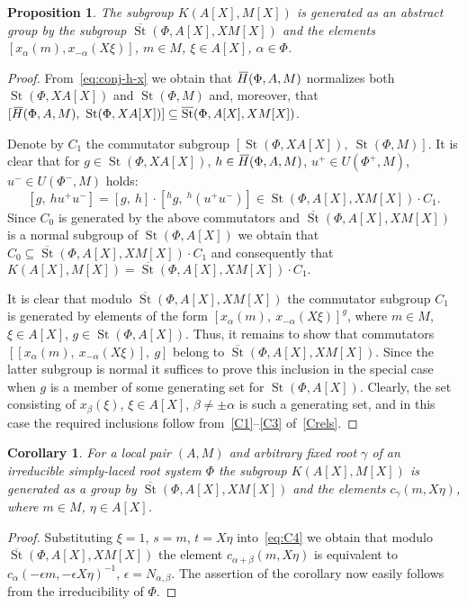 \documentclass[oneside, 8pt]{amsart}
\newtheorem{prop}[lemma]{Proposition}
\newtheorem{corollary}[lemma]{Corollary}
\theoremstyle{remark}
\theoremstyle{definition}
\numberwithin{lemma}{section}
\numberwithin{prop}{section}
\numberwithin{corollary}{section}
\numberwithin{externaltheorem}{section}
\DeclareMathOperator{\St}{St}
\newcommand{\myol}[2][3]{{}\mkern#1mu\overline{\mkern-#1mu#2}}
\numberwithin{equation}{section}
\begin{document}
\begin{prop} \label{Kgen} The subgroup $K(A[X], M[X])$ is generated as an abstract group by the subgroup $\overline{\St}(\Phi, A[X], XM[X])$ and
 the elements $[x_\alpha(m), x_{-\alpha}(X\xi)]$, $m \in M$, $\xi \in A[X]$, $\alpha \in \Phi$. \end{prop}
\begin{proof} From~\eqref{eq:conj-h-x} we obtain that $\myol{H}(\Phi, A, M)$ normalizes both $\St(\Phi, XA[X])$ and $\St(\Phi, M)$ and, moreover, that $[\myol{H}(\Phi, A, M),\ \St(\Phi, XA[X])] \subseteq \overline{\St}(\Phi, A[X], XM[X])$. 

Denote by $C_1$ the commutator subgroup $[\St(\Phi, XA[X]),\ \St(\Phi, M)]$.
It is clear that for $g \in \St(\Phi, XA[X])$, $h \in \myol{H}(\Phi, A, M)$, $u^+ \in U(\Phi^+, M)$, $u^- \in U(\Phi^-, M)$ holds:
\[ [g,\ h u^+ u^-] = [g,\ h] \cdot [{}^{h}\!g,\ {}^{h}\!(u^+u^-)] \in \St(\Phi, A[X], XM[X]) \cdot C_1.\]
Since $C_0$ is generated by the above commutators and $\overline{\St}(\Phi, A[X], XM[X])$ is a normal subgroup of $\St(\Phi, A[X])$
we obtain that $C_0 \subseteq \overline{\St}(\Phi, A[X], XM[X]) \cdot C_1$ and consequently that
$K(A[X], M[X]) = \overline{\St}(\Phi, A[X], XM[X]) \cdot C_1.$
 
It is clear that modulo $\overline{\St}(\Phi, A[X], XM[X])$ the commutator subgroup $C_1$ is generated by elements of the form $[x_\alpha(m),\ x_{-\alpha}(X\xi)]^g$, where $m \in M$, $\xi \in A[X]$, $g \in \St(\Phi, A[X])$.
Thus, it remains to show that commutators $[[x_\alpha(m),\ x_{-\alpha}(X\xi)],\ g]$ belong to $\overline{\St}(\Phi, A[X], XM[X])$.
Since the latter subgroup is normal it suffices to prove this inclusion in the special case when $g$ is a member of some generating set for $\St(\Phi, A[X])$.
Clearly, the set consisting of $x_\beta(\xi)$, $\xi \in A[X]$, $\beta \neq \pm \alpha$ is such a generating set, 
 and in this case the required inclusions follow from~\eqref{C1}--\eqref{C3} of~\cref{Crels}. \end{proof}

\begin{corollary} \label{Kgen-strong} For a local pair $(A, M)$ and arbitrary fixed root $\gamma$ of an irreducible simply-laced root system $\Phi$ the subgroup $K(A[X], M[X])$ is generated as a group by $\overline{\St}(\Phi, A[X], XM[X])$ and the elements $c_{\gamma}(m, X\eta)$, where $m \in M$, $\eta \in A[X]$. \end{corollary}
\begin{proof} Substituting $\xi = 1$, $s = m$, $t = X\eta$ into~\eqref{eq:C4} we obtain that modulo 
 $\overline{\St}(\Phi, A[X], XM[X])$ the element $c_{\alpha + \beta}(m, X\eta)$ is equivalent to $c_{\alpha}(-\epsilon m, -\epsilon X \eta)^{-1}$, $\epsilon = N_{\alpha, \beta}$. The assertion of the corollary now easily follows from the irreducibility of $\Phi$. \end{proof}   
\end{document}
